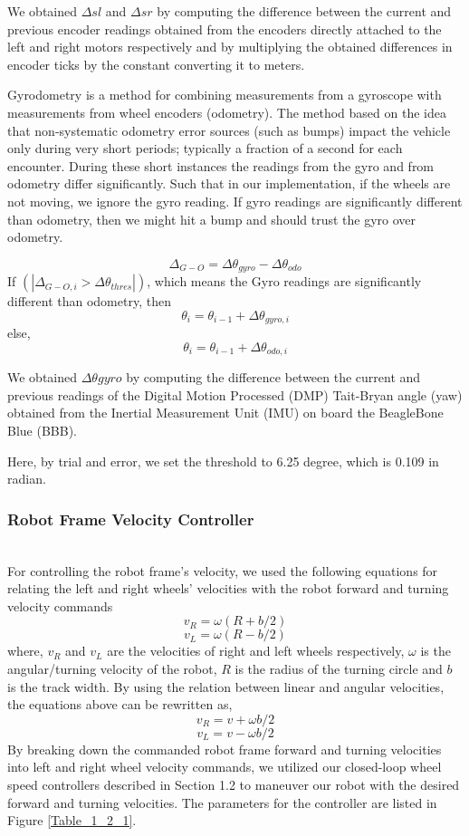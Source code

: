 \documentclass[journal]{IEEEtran}
\begin{document}
We obtained $\Delta sl$ and $\Delta sr$ by computing the difference between the current and previous encoder readings obtained from the encoders directly attached to the left and right motors respectively and by multiplying the obtained differences in encoder ticks by the constant converting it to meters.


Gyrodometry \cite{503813, borenstein1996measurement} is a method for combining measurements from a gyroscope with measurements from wheel encoders (odometry). The method based on the idea that non-systematic odometry error sources (such as bumps) impact the vehicle only during very short periods; typically a fraction of a second for each encounter. During these short instances the readings from the gyro and from odometry differ significantly. Such that in our implementation, if the wheels are not moving, we ignore the gyro reading. If gyro readings are significantly different than odometry, then we might hit a bump and should trust the gyro over odometry.

$$\Delta_{G-O}=\Delta\theta_{gyro}-\Delta\theta_{odo}$$
If $(|\Delta_{G-O,i}>\Delta\theta_{thres}|)$, which means the Gyro readings are significantly different than odometry, then
$$\theta_i=\theta_{i-1}+\Delta\theta_{gyro,i}$$
else,
$$\theta_i=\theta_{i-1}+\Delta\theta_{odo,i}$$

We obtained $\Delta \theta gyro$ by computing the difference between the current and previous readings of the Digital Motion Processed (DMP) Tait-Bryan angle (yaw) obtained from the Inertial Measurement Unit (IMU) on board the BeagleBone Blue (BBB). 

Here, by trial and error, we set the threshold to 6.25 degree, which is 0.109 in radian.\\


\subsubsection{Robot Frame Velocity Controller}  \hfill\\

For controlling the robot frame’s velocity, we used the following equations for relating the left and right wheels’ velocities with the robot forward and turning velocity commands
$$v_R=\omega(R+b/2)$$
$$v_L=\omega(R-b/2)$$
\noindent where, $v_R$ and $v_L$ are the velocities of right and left wheels respectively, $\omega$ is the angular/turning velocity of the robot, $R$ is the radius of the turning circle and $b$ is the track width. By using the relation between linear and angular velocities, the equations above can be rewritten as,
$$v_R=v+\omega b/2$$
$$v_L=v-\omega b/2$$
By breaking down the commanded robot frame forward and turning velocities into left and right wheel velocity commands, we utilized our closed-loop wheel speed controllers described in Section 1.2 to maneuver our robot with the desired forward and turning velocities. The parameters for the controller are listed in Figure \ref{Table_1_2_1}.
\end{document}
